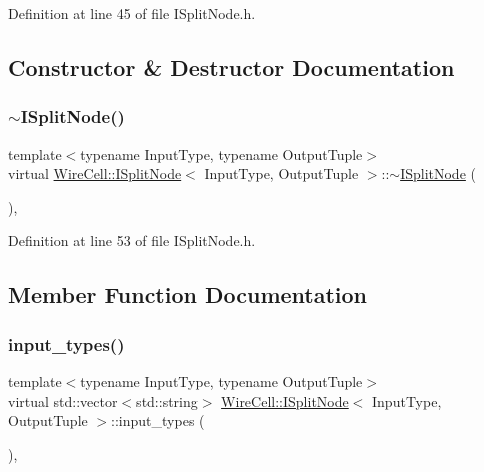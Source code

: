 Definition at line 45 of file I\+Split\+Node.\+h.



\subsection{Constructor \& Destructor Documentation}
\mbox{\label{class_wire_cell_1_1_i_split_node_ae89ad2fc266377589e4041c0cf84b350}} 
\subsubsection{\texorpdfstring{$\sim$\+I\+Split\+Node()}{~ISplitNode()}}
{\footnotesize\ttfamily template$<$typename Input\+Type, typename Output\+Tuple$>$ \\
virtual \hyperlink{class_wire_cell_1_1_i_split_node}{Wire\+Cell\+::\+I\+Split\+Node}$<$ Input\+Type, Output\+Tuple $>$\+::$\sim$\hyperlink{class_wire_cell_1_1_i_split_node}{I\+Split\+Node} (\begin{DoxyParamCaption}{ }\end{DoxyParamCaption})\hspace{0.3cm}{\ttfamily [inline]}, {\ttfamily [virtual]}}



Definition at line 53 of file I\+Split\+Node.\+h.



\subsection{Member Function Documentation}
\mbox{\label{class_wire_cell_1_1_i_split_node_a777776f3e11a8fb95c1e8974249a1f8d}} 
\subsubsection{\texorpdfstring{input\+\_\+types()}{input\_types()}}
{\footnotesize\ttfamily template$<$typename Input\+Type, typename Output\+Tuple$>$ \\
virtual std\+::vector$<$std\+::string$>$ \hyperlink{class_wire_cell_1_1_i_split_node}{Wire\+Cell\+::\+I\+Split\+Node}$<$ Input\+Type, Output\+Tuple $>$\+::input\+\_\+types (\begin{DoxyParamCaption}{ }\end{DoxyParamCaption})\hspace{0.3cm}{\ttfamily [inline]}, {\ttfamily [virtual]}}



